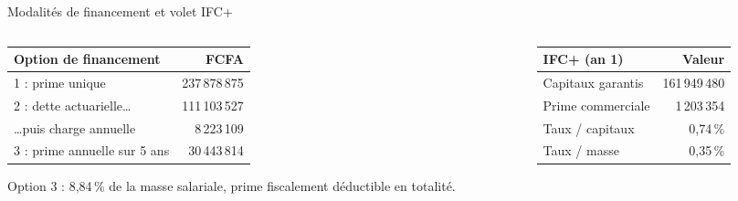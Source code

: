 \documentclass[aspectratio=169,11pt]{beamer}
\begin{document}
\begin{frame}{Modalités de financement et volet IFC+}
  \vspace{0.2cm}
  \begin{columns}[T]
    \begin{column}{0.54\textwidth}
      \small
      \begin{tabular}{lr}
        \toprule
        \rowcolor{orangeM} Option de financement & FCFA \\
        \midrule
        1 : prime unique & 237\,878\,875 \\
        2 : dette actuarielle\ldots & 111\,103\,527 \\
        \quad\ldots puis charge annuelle & 8\,223\,109 \\
        3 : prime annuelle sur 5 ans & 30\,443\,814 \\
        \bottomrule
      \end{tabular}
      \vspace{0.2cm}

      {\small Option 3 : 8,84\,\% de la masse salariale, prime fiscalement
      déductible en totalité.}
    \end{column}
    \begin{column}{0.42\textwidth}
      \small
      \begin{tabular}{lr}
        \toprule
        \rowcolor{orangeM} IFC+ (an 1) & Valeur \\
        \midrule
        Capitaux garantis & 161\,949\,480 \\
        Prime commerciale & 1\,203\,354 \\
        Taux / capitaux & 0,74\,\% \\
        Taux / masse & 0,35\,\% \\
        \bottomrule
      \end{tabular}
    \end{column}
  \end{columns}
\end{frame}
\end{document}
